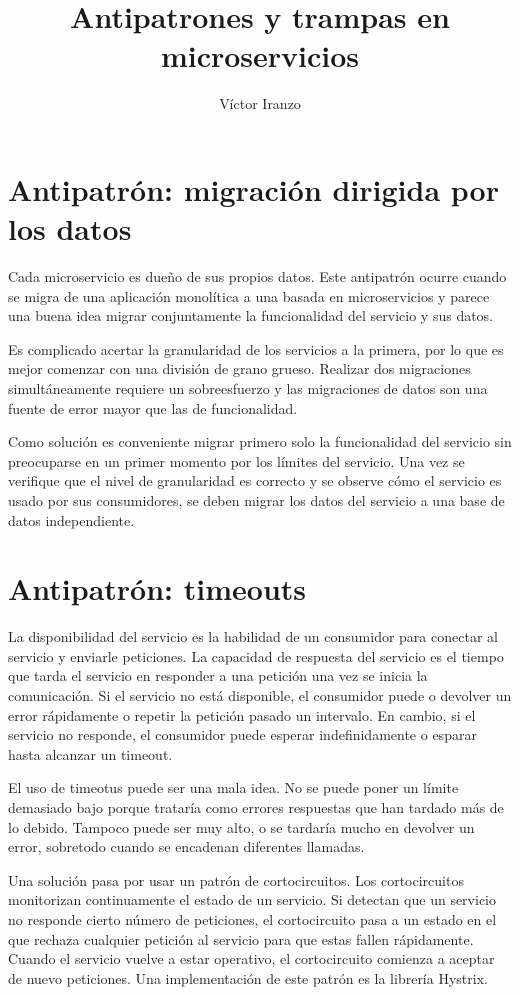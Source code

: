 \documentclass[11pt,a4paper]{article}
\author{Víctor Iranzo}
\title{Antipatrones y trampas en microservicios}
\begin{document}
\maketitle

\section{Antipatrón: migración dirigida por los datos}

Cada microservicio es dueño de sus propios datos. Este antipatrón ocurre cuando se migra de una aplicación monolítica a una basada en microservicios y parece una buena idea migrar conjuntamente la funcionalidad del servicio y sus datos.

Es complicado acertar la granularidad de los servicios a la primera, por lo que es mejor comenzar con una división de grano grueso. Realizar dos migraciones simultáneamente requiere un sobreesfuerzo y las migraciones de datos son una fuente de error mayor que las de funcionalidad.

Como solución es conveniente migrar primero solo la funcionalidad del servicio sin preocuparse en un primer momento por los límites del servicio. Una vez se verifique que el nivel de granularidad es correcto y se observe cómo el servicio es usado por sus consumidores, se deben migrar los datos del servicio a una base de datos independiente.

\section{Antipatrón: timeouts}

La disponibilidad del servicio es la habilidad de un consumidor para conectar al servicio y enviarle peticiones. La capacidad de respuesta del servicio es el tiempo que tarda el servicio en responder a una petición una vez se inicia la comunicación. Si el servicio no está disponible, el consumidor puede o devolver un error rápidamente o repetir la petición pasado un intervalo. En cambio, si el servicio no responde, el consumidor puede esperar indefinidamente o esparar hasta alcanzar un timeout. 

El uso de timeotus puede ser una mala idea. No se puede poner un límite demasiado bajo porque trataría como errores respuestas que han tardado más de lo debido. Tampoco puede ser muy alto, o se tardaría mucho en devolver un error, sobretodo cuando se encadenan diferentes llamadas.

Una solución pasa por usar un patrón de cortocircuitos. Los cortocircuitos monitorizan continuamente el estado de un servicio. Si detectan que un servicio no responde cierto número de peticiones, el cortocircuito pasa a un estado en el que rechaza cualquier petición al servicio para que estas fallen rápidamente. Cuando el servicio vuelve a estar operativo, el cortocircuito comienza a aceptar de nuevo peticiones. Una implementación de este patrón es la librería Hystrix.
\end{document}
